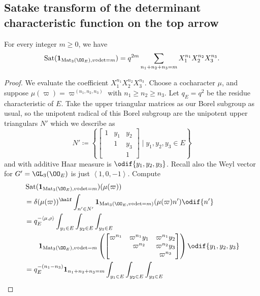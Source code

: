 \subsection{Satake transform of the determinant characteristic function on the top arrow}
\begin{proposition}
  For every integer $m \ge 0$, we have
  \[ \Sat(\mathbf{1}_{\Mat_3(\OO_E), v\circ\det=m})
    = q^{2m} \sum_{n_1 + n_2 + n_3 = m} X_1^{n_1} X_2^{n_2} X_3^{n_3}. \]
\end{proposition}
\begin{proof}
  We evaluate the coefficient $X_1^{n_1} X_2^{n_2} X_3^{n_3}$.
  Choose a cocharacter $\mu$,
  and suppose $\mu(\varpi) = \varpi^{(n_1, n_2, n_3)}$ with $n_1 \ge n_2 \ge n_3$.
  Let $q_E = q^2$ be the residue characteristic of $E$.
  Take the upper triangular matrices as our Borel subgroup as usual,
  so the unipotent radical of this Borel subgroup
  are the unipotent upper triangulars $N'$ which we describe as
  \[ N' \coloneqq \left\{ \begin{bmatrix}
      1 & y_1 & y_2 \\
        & 1 & y_3 \\
        &   & 1 \end{bmatrix} \mid y_1, y_2, y_3 \in E \right\} \]
  and with additive Haar measure is $\odif{y_1,y_2,y_3}$.
  Recall also the Weyl vector for $G' = \GL_3(\OO_E)$ is just $\left< 1,0,-1\right>$.
  Compute
  \begin{align*}
    &\Sat(\mathbf{1}_{\Mat_3(\OO_E), v\circ\det=m})(\mu(\varpi)) \\
    &= \delta(\mu(\varpi))^\half \int_{n' \in N'}
      \mathbf{1}_{\Mat_3(\OO_E, v\circ \det = m)} (\mu(\varpi) n') \odif{n'} \\
    &= q_E^{-\left< \mu, \rho\right>} \int_{y_1 \in E} \int_{y_2 \in E} \int_{y_3 \in E} \\
    &\qquad
      \mathbf{1}_{\Mat_3(\OO_E), v \circ \det = m}
      \left(
        \begin{bmatrix}
          \varpi^{n_1} & \varpi^{n_1} y_1 & \varpi^{n_1} y_2 \\
          & \varpi^{n_2} & \varpi^{n_2} y_3 \\
          & & \varpi^{n_3} \\
        \end{bmatrix}
      \right) \odif{y_1,y_2,y_3} \\
    &= q_E^{-(n_1-n_3)} \mathbf{1}_{n_1+n_2+n_3=m}
    \int_{y_1 \in E} \int_{y_2 \in E} \int_{y_3 \in E} \\

\end{align*}
\end{proof}
